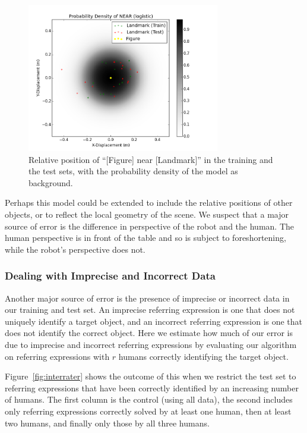 \documentclass[letterpaper,10pt]{article}
\begin{document}
\begin{figure}[h!tb]
  \centering
    \includegraphics[width=0.75\textwidth]{near_train_test_comp}
  \caption{Relative position of ``[Figure] near [Landmark]'' in the training and the test sets, with the probability density of the model as background.}
  \label{fig:near_comp}
\end{figure}

Perhaps this model could be extended to include the relative positions of other objects, or to reflect the local geometry of the scene. We suspect that a major source of error is the difference in perspective of the robot and the human. The human perspective is in front of the table and so is subject to foreshortening, while the robot's perspective does not.

\subsubsection{Dealing with Imprecise and Incorrect Data}

Another major source of error is the presence of imprecise or incorrect data in our training and test set. An imprecise referring expression is one that does not uniquely identify a target object, and an incorrect referring expression is one that does not identify the correct object. Here we estimate how much of our error is due to imprecise and incorrect referring expressions by evaluating our algorithm on referring expressions with $r$ humans correctly identifying the target object.

Figure~\ref{fig:interrater} shows the outcome of this when we restrict the test set to referring expressions that have been correctly identified by an increasing number of humans. The first column is the control (using all data), the second includes only referring expressions correctly solved by at least one human, then at least two humans, and finally only those by all three humans.
\end{document}
